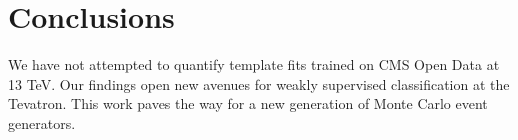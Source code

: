\section{Conclusions}\label{sec:conclusions}

We have not attempted to quantify template fits trained on CMS Open Data
at 13 TeV. Our findings open new avenues for weakly supervised
classification at the Tevatron. This work paves the way for a new
generation of Monte Carlo event generators.

